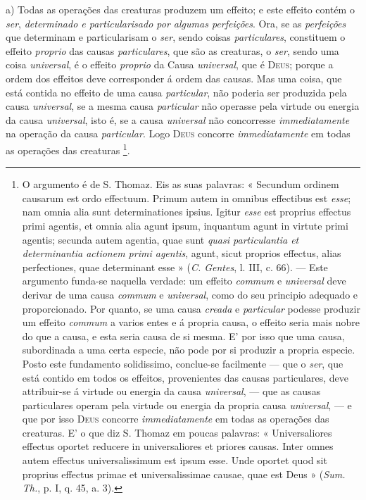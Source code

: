 a) Todas as operações das creaturas produzem um effeito; e este effeito contém o \emph{ser}, \emph{determinado e particularisado por algumas perfeições}. Ora, se as \emph{perfeições} que determinam e particularisam o \emph{ser}, sendo coisas \emph{particulares}, constituem o effeito \emph{proprio} das causas \emph{particulares}, que são as creaturas, o \emph{ser}, sendo uma coisa \emph{universal}, é o effeito \emph{proprio} da Causa \emph{universal}, que é \textsc{Deus}; porque a ordem dos effeitos deve corresponder á ordem das causas. Mas uma coisa, que está contida no effeito de uma causa \emph{particular}, não poderia ser produzida pela causa \emph{universal}, se a mesma causa \emph{particular} não operasse pela virtude ou energia da causa \emph{universal}, isto é, se a causa \emph{universal} não concorresse \emph{immediatamente} na operação da causa \emph{particular}. Logo \textsc{Deus} concorre \emph{immediatamente} em todas as operações das creaturas \footnote{O argumento é de S. Thomaz. Eis as suas palavras: « Secundum ordinem causarum est ordo effectuum. Primum autem in omnibus effectibus est \emph{esse}; nam omnia alia sunt determinationes ipsius. Igitur \emph{esse} est proprius effectus primi agentis, et omnia alia agunt ipsum, inquantum agunt in virtute primi agentis; secunda autem agentia, quae sunt \emph{quasi particulantia et determinantia actionem primi agentis}, agunt, sicut proprios effectus, alias perfectiones, quae determinant esse » (\emph{C. Gentes}, l. III, c. 66). --- Este argumento funda-se naquella verdade: um effeito \emph{commum} e \emph{universal} deve derivar de uma causa \emph{commum} e \emph{universal}, como do seu principio adequado e proporcionado. Por quanto, se uma causa \emph{creada} e \emph{particular} podesse produzir um effeito \emph{commum} a varios entes e á propria causa, o effeito seria mais nobre do que a causa, e esta seria causa de si mesma. E' por isso que uma causa, subordinada a uma certa especie, não pode por si produzir a propria especie. Posto este fundamento solidissimo, conclue-se facilmente --- que o \emph{ser}, que está contido em todos os effeitos, provenientes das causas particulares, deve attribuir-se á virtude ou energia da causa \emph{universal}, --- que as causas particulares operam pela virtude ou energia da propria causa \emph{universal}, --- e que por isso \textsc{Deus} concorre \emph{immediatamente} em todas as operações das creaturas. E' o que diz S. Thomaz em poucas palavras: « Universaliores effectus oportet reducere in universaliores et priores causas. Inter omnes autem effectus universalissimum est ipsum esse. Unde oportet quod sit proprius effectus primae et universalissimae causae, quae est Deus » (\emph{Sum. Th.}, p. I, q. 45, a. 3).}.

